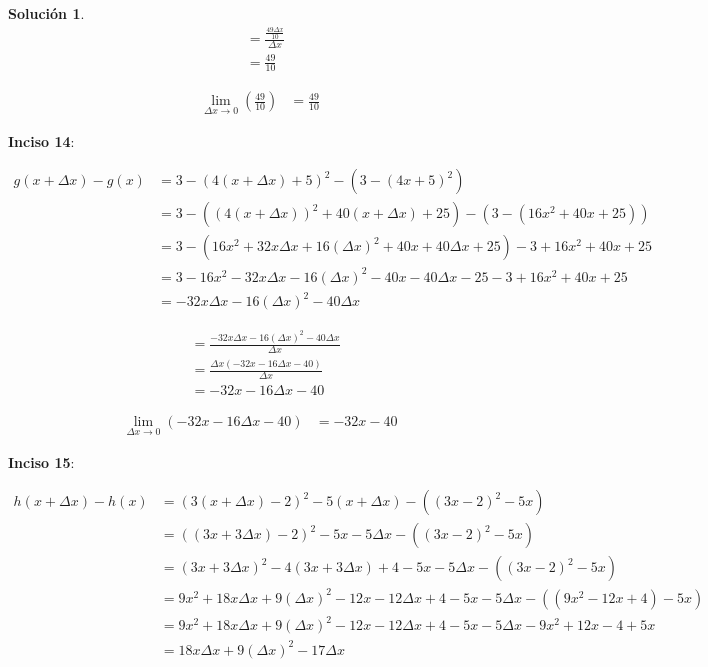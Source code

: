 \documentclass{article}
\theoremstyle{definition}
\newtheorem*{solution}{Solución}
\begin{document}
\begin{solution}
    \begin{align*}
        &= \frac{\frac{49\Delta x}{10}}{\Delta x} \\
        &= \frac{49}{10}
    \end{align*}

    \begin{align*}
        \lim_{\Delta x \to 0} (\frac{49}{10}) &= \frac{49}{10}
    \end{align*}

\textbf{Inciso 14}:

    \begin{align*}
        g(x+\Delta x)-g(x) &= 3-(4(x+\Delta x)+5)^2-(3-(4x+5)^2) \\
        &= 3-((4(x+\Delta x))^2+40(x+\Delta x)+25)-(3-(16x^2+40x+25)) \\
        &= 3-(16x^2+32x\Delta x+16(\Delta x)^2+40x+40\Delta x+25)-3+16x^2+40x+25 \\
        &= 3-16x^2-32x\Delta x-16(\Delta x)^2-40x-40\Delta x-25-3+16x^2+40x+25 \\
        &= -32x\Delta x-16(\Delta x)^2-40\Delta x
    \end{align*}

    \begin{align*}
        &= \frac{-32x\Delta x-16(\Delta x)^2-40\Delta x}{\Delta x} \\
        &= \frac{\Delta x(-32x-16\Delta x-40)}{\Delta x} \\
        &= -32x-16\Delta x-40
    \end{align*}

    \begin{align*}
        \lim_{\Delta x \to 0} (-32x-16\Delta x-40) &= -32x-40
    \end{align*}

\textbf{Inciso 15}:

    \begin{align*}
        h(x+\Delta x)-h(x) &= (3(x+\Delta x)-2)^2-5(x+\Delta x) - ((3x-2)^2-5x) \\
        &= ((3x+3\Delta x)-2)^2-5x-5\Delta x - ((3x-2)^2-5x) \\
        &= (3x+3\Delta x)^2-4(3x+3\Delta x)+4-5x-5\Delta x - ((3x-2)^2-5x) \\
        &= 9x^2+18x\Delta x+9(\Delta x)^2-12x-12\Delta x+4-5x-5\Delta x - ((9x^2-12x+4)-5x) \\
        &= 9x^2+18x\Delta x+9(\Delta x)^2-12x-12\Delta x+4-5x-5\Delta x -9x^2+12x-4+5x \\
        &= 18x\Delta x+9(\Delta x)^2-17\Delta x
    \end{align*}


\end{solution}
\end{document}
